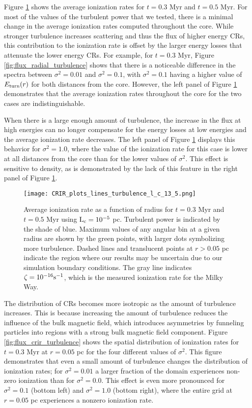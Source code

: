 \documentclass[twocolumn]{aastex63}
\begin{document}
Figure \ref{fig:flux_crir_turbulence_13_5} shows the average ionization rates for $t=0.3$ Myr and $t=0.5$ Myr. For most of the values of the turbulent power that we tested, there is a minimal change in the average ionization rates computed throughout the core. While stronger turbulence increases scattering and thus the flux of higher energy CRs, this contribution to the ionization rate is offset by the larger energy losses that attenuate the lower energy CRs. For example, for $t=0.3$ Myr, Figure \ref{fig:flux_radial_turbulence} shows that there is a noticeable difference in the spectra between $\sigma^2=0.01$ and $\sigma^2=0.1$, with $\sigma^2=0.1$ having a higher value of $E_{\rm turn}(r)$ for both distances from the core. However, the left panel of Figure \ref{fig:flux_crir_turbulence_13_5} demonstrates that the average ionization rates throughout the core for the two cases are indistinguishable. 

When there is a large enough amount of turbulence, the increase in the flux at high energies can no longer compensate for the energy losses at low energies and the average ionization rate decreases. The left panel of Figure \ref{fig:flux_crir_turbulence_13_5} displays this behavior for $\sigma^2=1.0$, where the value of the ionization rate for this case is lower at all distances from the core than for the lower values of $\sigma^2$. This effect is sensitive to density, as is demonstrated by the lack of this feature in the right panel of Figure \ref{fig:flux_crir_turbulence_13_5}.

\begin{figure*}
\centering
\texttt{[image: CRIR\_plots\_lines\_turbulence\_l\_c\_13\_5.png]}
\caption{Average ionization rate as a function of radius for $t=0.3$ Myr and $t=0.5$ Myr using $\rm L_c=10^{-5}$ pc. Turbulent power is indicated by the shade of blue. Maximum values of any angular bin at a given radius are shown by the green points, with larger dots symbolizing more turbulence. Dashed lines and translucent points at $r>0.05$ pc indicate the region where our results may be uncertain due to our simulation boundary conditions. The gray line indicates $\zeta=10^{-16} \rm s^{-1}$, which is the measured ionization rate for the Milky Way.}
\label{fig:flux_crir_turbulence_13_5}
\end{figure*}

The distribution of CRs becomes more isotropic as the amount of turbulence increases.  This is because increasing the amount of turbulence reduces the influence of the bulk magnetic field, which introduces asymmetries by funneling particles into regions with a strong bulk magnetic field component. Figure \ref{fig:flux_crir_turbulence} shows the spatial distribution of ionization rates for $t=0.3$ Myr at $r=0.05$ pc for the four different values of $\sigma^2$. This figure demonstrates that even a small amount of turbulence changes the distribution of ionization rates; for $\sigma^2 = 0.01$ a larger fraction of the domain experiences non-zero ionization than for $\sigma^2 = 0.0$. This effect is even more pronounced for $\sigma^2=0.1$ (bottom left) and $\sigma^2=1.0$ (bottom right), where the entire grid at $r=0.05$ pc experiences a nonzero ionization rate.
\end{document}
